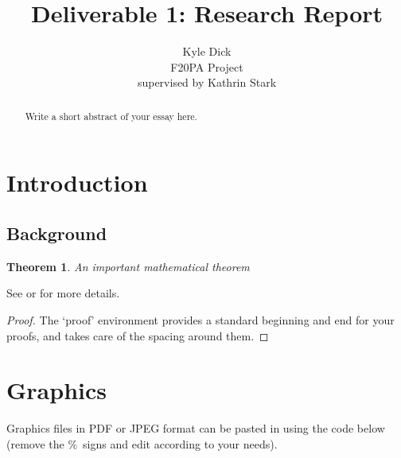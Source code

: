 \documentclass[12pt]{article}  %
\title{Deliverable 1: Research Report}
\author{Kyle Dick\\
F20PA Project\\
supervised by
Kathrin Stark}
\newtheorem{theorem}{Theorem}[section]          %
\theoremstyle{definition}
\theoremstyle{remark}
\begin{document}
\maketitle

\newpage                     %
\begin{abstract}

Write a short abstract of your essay here.



\end{abstract}

\newpage                     %
\tableofcontents

\newpage                     %
\section{Introduction}\label{s:intro}
%

\subsection{Background}\label{ss:back}

\begin{theorem}\label{th:important}
 An important mathematical theorem
\end{theorem}

See \cite[Chapter 3]{Cassels} or \cite{Bovey} for more details.

\begin{proof}
The `proof' environment provides a standard beginning and end for your proofs,
and takes care of the spacing around them.
\end{proof}

\section{Graphics}

Graphics files in PDF or JPEG format can be pasted in using the code
below (remove the \%\ signs and edit according to your needs).

%
%
%
%
%
\end{document}
